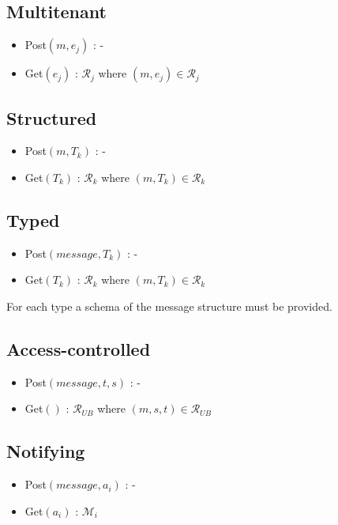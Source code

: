 \documentclass[bibtotoc,halfparskip,oneside]{scrreprt}
\newcommand{\UB}{\ensuremath{\mathit{UB}}\xspace}
\begin{document}
\subsection{Multitenant}

\begin{itemize}
	\item Post$(m,e_j)$ : -
	\item Get$(e_j)$ : $\mathcal{R}_j$ where $(m,e_j) \in \mathcal{R}_j$
\end{itemize}

\subsection{Structured}

\begin{itemize}
	\item Post$(m,T_k)$ : -
	\item Get$(T_k)$ : $\mathcal{R}_k$ where $(m,T_k) \in \mathcal{R}_k$
\end{itemize}

\subsection{Typed}

\begin{itemize}
	\item Post$(message,T_k)$ : -
	\item Get$(T_k)$ : $\mathcal{R}_k$ where $(m,T_k) \in \mathcal{R}_k$
\end{itemize}
For each type a schema of the message structure must be provided.

\subsection{Access-controlled}

\begin{itemize}
	\item Post$(message,t,s)$ : -
	\item Get$()$ : $\mathcal{R}_\UB$ where $(m,s,t) \in \mathcal{R}_\UB$
\end{itemize}

\subsection{Notifying}

\begin{itemize}
	\item Post$(message,a_i)$ : -
	\item Get$(a_i)$ : $\mathcal{M}_i$
\end{itemize}
\end{document}
